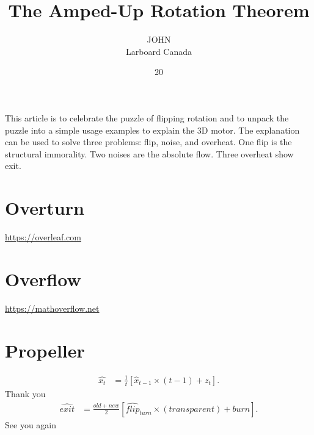 \documentclass{article}
\title{The Amped-Up Rotation Theorem}
\author{
  \parbox{0.3\linewidth}{\centering JOHN\\Larboard Canada}
  }
\date{20}
\begin{document}
\maketitle

This article is to celebrate the puzzle of flipping rotation and to unpack the puzzle into a simple usage examples to explain the 3D motor. The explanation can be used to solve three problems: flip, noise, and overheat. One flip is the structural immorality. Two noises are the absolute flow. Three overheat show exit.

\section{Overturn}
\url{https://overleaf.com}

\section{Overflow}
\url{https://mathoverflow.net}

\section{Propeller}
\newline{}
\begin{align}
    \hat{x_t} &= \frac{1}{t} \left[ \hat{x}_{t-1} \times (t-1) + z_t \right].
\end{align}
Thank you
\begin{align}
    \hat{exit} &= \frac{old+new}{2} \left[ \hat{flip}_{turn} \times (transparent) + burn \right].
\end{align}
See you again



\end{document}
